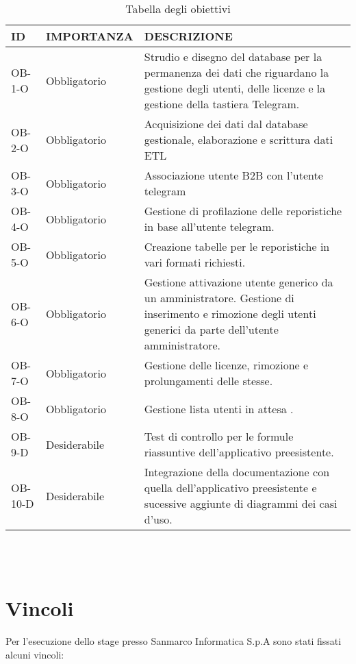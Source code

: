 \begin{table}

\begin{tabular}{ |p{2cm}|p{3cm}|p{8cm}| }
 \hline
\textbf{ ID}   &  \textbf{IMPORTANZA}    &  \textbf{DESCRIZIONE} \\ 

 \hline
  OB-1-O &  Obbligatorio   & Strudio e disegno del database per la permanenza dei dati che riguardano la gestione degli utenti, delle licenze e la gestione della tastiera Telegram.\\
 \hline
OB-2-O &   Obbligatorio  &  Acquisizione dei dati dal database gestionale, elaborazione  e scrittura dati ETL \\
 \hline
 OB-3-O &   Obbligatorio  &  Associazione utente B2B con l'utente telegram \\
 \hline
 OB-4-O & Obbligatorio & Gestione di profilazione delle reporistiche in base all'utente telegram.\\
\hline
OB-5-O  & Obbligatorio & Creazione tabelle per le reporistiche in vari formati richiesti. \\
\hline
OB-6-O  &  Obbligatorio  & Gestione attivazione utente generico da un amministratore. Gestione di inserimento e rimozione degli utenti generici da parte dell'utente amministratore.\\
\hline  
OB-7-O & Obbligatorio & Gestione delle licenze, rimozione e prolungamenti delle stesse. \\
\hline
OB-8-O & Obbligatorio & Gestione lista utenti in attesa . \\
\hline
OB-9-D & Desiderabile & Test di controllo per le formule riassuntive dell'applicativo preesistente. \\
\hline
OB-10-D & Desiderabile & Integrazione della documentazione con quella  dell'applicativo preesistente e sucessive aggiunte di diagrammi dei casi d'uso. \\
\hline
\end{tabular}
\\\\
\caption{Tabella degli obiettivi}
\end{table}





\section{Vincoli}
Per l'esecuzione dello stage presso Sanmarco Informatica S.p.A sono stati fissati alcuni vincoli: \\\\

